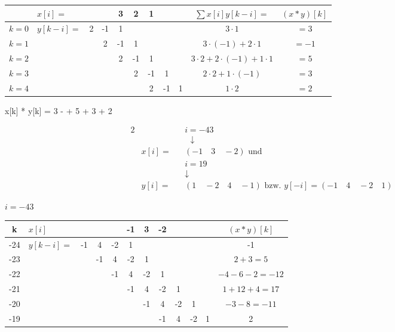 \documentclass[parskip=half]{scrreprt}
\begin{document}
\begin{tbox}
	\begin{tabular}{c | l c c c c c c c | c c}
		& $x[i] =$ & & &3 & 2 & 1 & & & $\sum x[i]y[k - i] =$ & $(x * y)[k]$\\\hline
		$ k = 0$ & $y[k - i] =$ & 2 & -1 & 1 & & & & & $3 \cdot 1$ & $= 3$\\
		$ k = 1$ & & & 2 & -1 & 1 & & & & $3 \cdot (-1) + 2 \cdot 1$ & $=-1$\\
		$ k = 2$ & & & & 2 & -1 & 1 &  & & $3 \cdot 2 + 2 \cdot (-1) + 1 \cdot 1$ & $=5$\\ 
		$ k = 3$ & & & & & 2 & -1 & 1 & & $2 \cdot 2 + 1 \cdot (-1)$ & $=3$\\
		$ k = 4$ & & & & & & 2 & -1 & 1 & $1 \cdot 2$ & $=2$\\
	\end{tabular}
\end{tbox}

\begin{abox}
	x[k] * y[k] = 3 \delta [k] - \delta [k - 1] + 5 \delta [k - 2] + 3 \delta [k - 3] + 2 \delta [k - 4]
\end{abox}

\begin{tbox}
	\begin{alignat*}{2}
		& &&i = -43\\
		& &&\text{ }\downarrow\\
		&x[i]= &&(-1\quad 3\quad -2) \text{ und}\\
		& &&i = 19\\
		& &&\downarrow\\
		& y[i]= &&(1\quad -2\quad 4\quad -1) \text{ bzw. } y[-i] = (-1\quad 4\quad -2\quad 1)
	\end{alignat*}	
\end{tbox}

\begin{tbox}
	$ i = -43$\\
	\begin{tabular}{c | l c c c c c c c c c | c}
		k & $x[i]$ & & & & -1 & 3 & -2  & & & & $(x * y)[k]$\\\hline
		-24 & $y[k - i] =$ & -1 & 4 & -2 & 1 & & & & & & -1\\
		-23 & & & -1 & 4 & -2 & 1 & & & & & $2 + 3 = 5$\\
		-22 & & & & -1 & 4 & -2 & 1 & & & & $-4-6-2 = -12$\\
		-21 & & & & & -1 & 4 & -2 & 1 & & & $1 + 12 + 4 = 17$\\
		-20 & & & & & & -1 & 4 & -2 & 1 & & $-3 - 8 = -11$\\
		-19 & & & & & & & -1 & 4 & -2 & 1 & 2\\
	\end{tabular}
\end{tbox}
\end{document}
